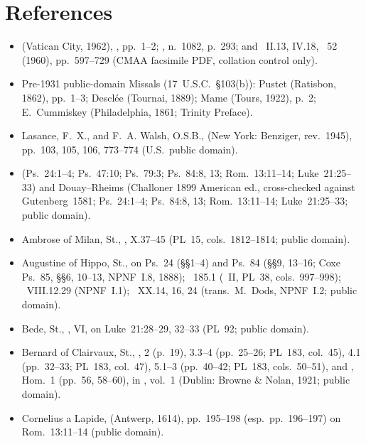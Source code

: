 \section{References}

{\small
\begin{itemize}[itemsep=0pt,parsep=1pt,topsep=0.15em]
\item {} (Vatican City, 1962), , pp.~1--2; , n.~1082, p.~293;  and ~II.13, IV.18, ~52 (1960), pp.~597--729 (CMAA facsimile PDF, collation control only).
\item Pre-1931 public-domain Missals (17~U.S.C.~\S103(b)): Pustet (Ratisbon, 1862), pp.~1--3; Descl\'ee (Tournai, 1889); Mame (Tours, 1922), p.~2; E.~Cummiskey (Philadelphia, 1861; Trinity Preface).
\item Lasance, F.~X., and F.~A. Walsh, O.S.B.,  (New York: Benziger, rev.\ 1945), pp.~103, 105, 106, 773--774 (U.S.~public domain).
\item {} (Ps.~24:1--4; Ps.~47:10; Ps.~79:3; Ps.~84:8, 13; Rom.~13:11--14; Luke~21:25--33) and Douay--Rheims (Challoner 1899 American ed., cross-checked against Gutenberg~1581; Ps.~24:1--4; Ps.~84:8, 13; Rom.~13:11--14; Luke~21:25--33; public domain).
\item Ambrose of Milan, St., , X.37--45 (PL~15, cols.~1812--1814; public domain).
\item Augustine of Hippo, St.,  on Ps.~24 (\S\S1--4) and Ps.~84 (\S\S9, 13--16; Coxe Ps.~85, \S\S6, 10--13, NPNF~I.8, 1888); ~185.1 (~II, PL~38, cols.~997--998); ~VIII.12.29 (NPNF~I.1); ~XX.14, 16, 24 (trans.\ M.~Dods, NPNF~I.2; public domain).
\item Bede, St., , VI, on Luke~21:28--29, 32--33 (PL~92; public domain).
\item Bernard of Clairvaux, St., , 2 (p.~19), 3.3--4 (pp.~25--26; PL~183, col.~45), 4.1 (pp.~32--33; PL~183, col.~47), 5.1--3 (pp.~40--42; PL~183, cols.~50--51), and , Hom.~1 (pp.~56, 58--60), in , vol.~1 (Dublin: Browne \& Nolan, 1921; public domain).
\item Cornelius a Lapide,  (Antwerp, 1614), pp.~195--198 (esp.~pp.~196--197) on Rom.~13:11--14 (public domain).

\end{itemize}}
